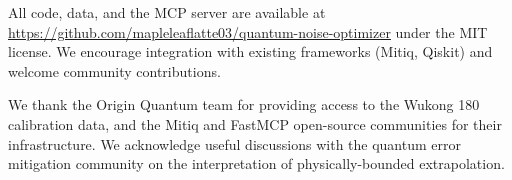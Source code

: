 All code, data, and the MCP server are available at \url{https://github.com/mapleleaflatte03/quantum-noise-optimizer} under the MIT license. We encourage integration with existing frameworks (Mitiq, Qiskit) and welcome community contributions.

\begin{acknowledgments}
We thank the Origin Quantum team for providing access to the Wukong 180 calibration data, and the Mitiq and FastMCP open-source communities for their infrastructure. We acknowledge useful discussions with the quantum error mitigation community on the interpretation of physically-bounded extrapolation.
\end{acknowledgments}
